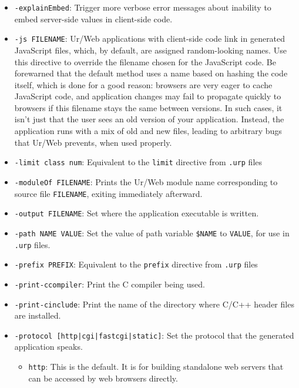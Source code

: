 \documentclass{article}
\begin{document}
\begin{itemize}
\item \texttt{-explainEmbed}: Trigger more verbose error messages about inability to embed server-side values in client-side code.

\item \texttt{-js FILENAME}: Ur/Web applications with client-side code link in generated JavaScript files, which, by default, are assigned random-looking names.  Use this directive to override the filename chosen for the JavaScript code.  Be forewarned that the default method uses a name based on hashing the code itself, which is done for a good reason: browsers are very eager to cache JavaScript code, and application changes may fail to propagate quickly to browsers if this filename stays the same between versions.  In such cases, it isn't just that the user sees an old version of your application.  Instead, the application runs with a mix of old and new files, leading to arbitrary bugs that Ur/Web prevents, when used properly.

\item \texttt{-limit class num}: Equivalent to the \texttt{limit} directive from \texttt{.urp} files

\item \texttt{-moduleOf FILENAME}: Prints the Ur/Web module name corresponding to source file \texttt{FILENAME}, exiting immediately afterward.

\item \texttt{-output FILENAME}: Set where the application executable is written.

\item \texttt{-path NAME VALUE}: Set the value of path variable \texttt{\$NAME} to \texttt{VALUE}, for use in \texttt{.urp} files.

\item \texttt{-prefix PREFIX}: Equivalent to the \texttt{prefix} directive from \texttt{.urp} files

\item \texttt{-print-ccompiler}: Print the C compiler being used.

\item \texttt{-print-cinclude}: Print the name of the directory where C/C++ header files are installed.

\item \texttt{-protocol [http|cgi|fastcgi|static]}: Set the protocol that the generated application speaks.
  \begin{itemize}
  \item \texttt{http}: This is the default.  It is for building standalone web servers that can be accessed by web browsers directly.


\end{itemize}
\end{itemize}
\end{document}

